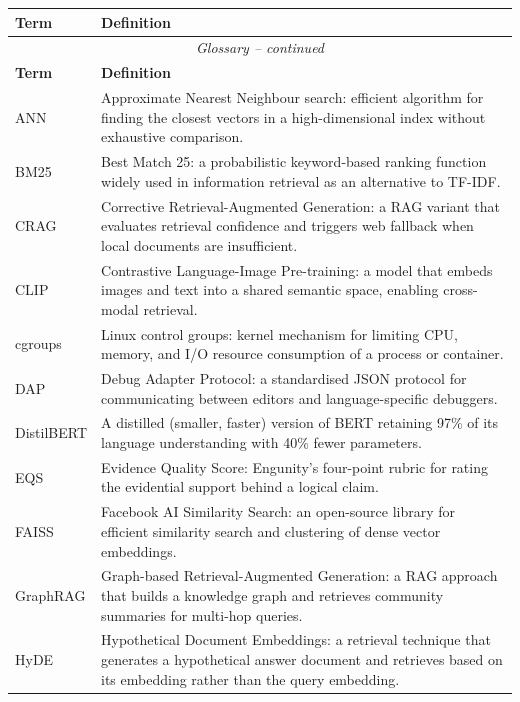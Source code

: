 \begin{longtable}{p{3.5cm} p{8cm}}
    \toprule
    \textbf{Term} & \textbf{Definition} \\
    \midrule
    \endfirsthead
    \multicolumn{2}{c}{\itshape Glossary -- continued} \\
    \toprule \textbf{Term} & \textbf{Definition} \\ \midrule
    \endhead
    \midrule
    \endfoot
    \bottomrule
    \endlastfoot
    ANN             & Approximate Nearest Neighbour search: efficient algorithm for finding the closest vectors in a high-dimensional index without exhaustive comparison. \\
    BM25            & Best Match 25: a probabilistic keyword-based ranking function widely used in information retrieval as an alternative to TF-IDF. \\
    CRAG            & Corrective Retrieval-Augmented Generation: a RAG variant that evaluates retrieval confidence and triggers web fallback when local documents are insufficient. \\
    CLIP            & Contrastive Language-Image Pre-training: a model that embeds images and text into a shared semantic space, enabling cross-modal retrieval. \\
    cgroups         & Linux control groups: kernel mechanism for limiting CPU, memory, and I/O resource consumption of a process or container. \\
    DAP             & Debug Adapter Protocol: a standardised JSON protocol for communicating between editors and language-specific debuggers. \\
    DistilBERT      & A distilled (smaller, faster) version of BERT retaining 97\% of its language understanding with 40\% fewer parameters. \\
    EQS             & Evidence Quality Score: Engunity's four-point rubric for rating the evidential support behind a logical claim. \\
    FAISS           & Facebook AI Similarity Search: an open-source library for efficient similarity search and clustering of dense vector embeddings. \\
    GraphRAG        & Graph-based Retrieval-Augmented Generation: a RAG approach that builds a knowledge graph and retrieves community summaries for multi-hop queries. \\
    HyDE            & Hypothetical Document Embeddings: a retrieval technique that generates a hypothetical answer document and retrieves based on its embedding rather than the query embedding. \\

\end{longtable}
